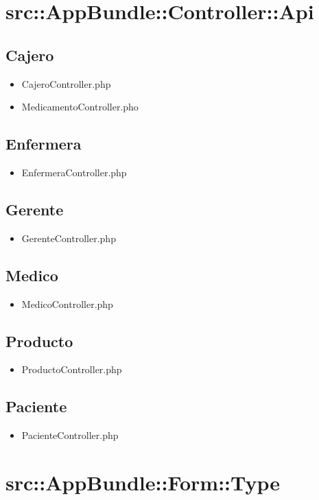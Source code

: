 	
	\section{src::AppBundle::Controller::Api}
		\subsection{Cajero}
		\begin{itemize}
		\item CajeroController.php
		\item MedicamentoController.pho
		\end{itemize}
		\subsection{Enfermera}
		\begin{itemize}
		\item EnfermeraController.php
		\end{itemize}
		\subsection{Gerente}
		\begin{itemize}
		\item GerenteController.php
		\end{itemize}
		\subsection{Medico}
		\begin{itemize}
		\item MedicoController.php
		\end{itemize}
		\subsection{Producto}
		\begin{itemize}
		\item ProductoController.php
		\end{itemize}
		\subsection{Paciente}
		\begin{itemize}
		\item PacienteController.php
		\end{itemize}
		
		
		
	\section{src::AppBundle::Form::Type}
	
